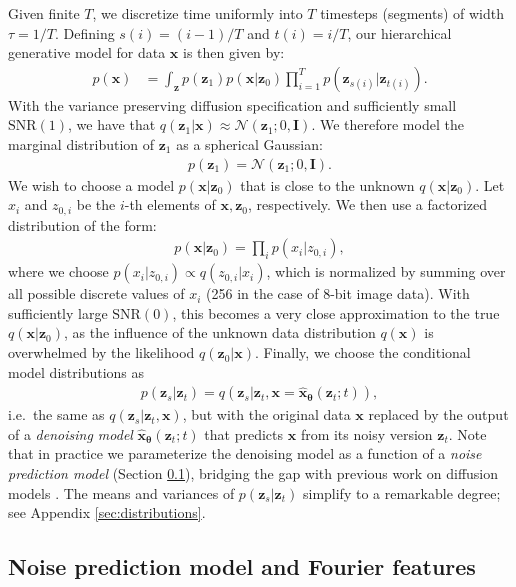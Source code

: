 \documentclass{article}
\def\rvx{{\mathbf{x}}}
\def\rvz{{\mathbf{z}}}
\newcommand{\bT}{{\boldsymbol{\theta}}}
\newcommand{\bfI}{\mathbf{I}}
\newcommand{\snr}{\text{SNR}}
\begin{document}
Given finite $T$, we discretize time uniformly into $T$ timesteps (segments) of width $\tau = 1/T$. Defining $s(i) = (i-1)/T$ and $t(i) = i/T$, our hierarchical generative model for data $\rvx$ is then given by:
\begin{align}
p(\rvx) &= \int_{\rvz} p(\rvz_{1})p(\rvx|\rvz_{0}) \prod_{i=1}^T p(\rvz_{s(i)}|\rvz_{t(i)}).
\end{align}
With the variance preserving diffusion specification and sufficiently small $\snr(1)$, we have that $q(\rvz_1|\rvx) \approx \mathcal{N}(\rvz_1; 0,\bfI)$. We therefore model the marginal distribution of $\rvz_1$ as a spherical Gaussian: 
\begin{align}
    p(\rvz_1) = \mathcal{N}(\rvz_1; 0, \bfI).
\end{align}
We wish to choose a model $p(\rvx|\rvz_0)$ that is close to the unknown $q(\rvx|\rvz_0)$. Let $x_i$ and $z_{0,i}$ be the $i$-th elements of $\rvx,  \rvz_0$, respectively. We then use a factorized distribution of the form:
\begin{align}
p(\rvx|\rvz_0) = \prod_i p(x_i|z_{0,i})\label{eq:recon},
\end{align}
where we choose $p(x_i |z_{0,i}) \propto q(z_{0,i}|x_i)$, which is normalized by summing over all possible discrete values of $x_i$ (256 in the case of 8-bit image data). With sufficiently large $\snr(0)$, this becomes a very close approximation to the true $q(\rvx|\rvz_0)$, as the influence of the unknown data distribution $q(\rvx)$ is overwhelmed by the likelihood $q(\rvz_0|\rvx)$.
Finally, we choose the conditional model distributions as \begin{align}p(\rvz_s|\rvz_t) = q(\rvz_s|\rvz_t, \rvx=\hat{\rvx}_{\bT}(\rvz_t; t)),
\end{align}
i.e.\ the same as $q(\rvz_s|\rvz_t,\mathbf{x})$, but with the original data $\rvx$ replaced by the output of a \emph{denoising model} $\hat{\rvx}_{\bT}(\rvz_t; t)$ that predicts $\rvx$ from its noisy version $\rvz_t$. Note that in practice we parameterize the denoising model as a function of a \emph{noise prediction model} (Section \ref{sec:noisepred}), bridging the gap with previous work on diffusion models \citep{ho2020denoising}. The means and variances of $p(\rvz_s|\rvz_t)$ simplify to a remarkable degree; see Appendix \ref{sec:distributions}. 

\subsection{Noise prediction model and Fourier features}
\label{sec:noisepred}
\end{document}
